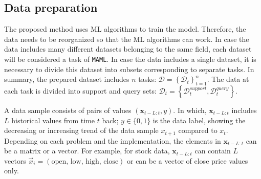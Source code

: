 \documentclass[aps,prb,groupedaddress,twocolumn,showpacs,dvipdfmx,superscriptaddress,pdftex]{revtex4-2}
\begin{document}
\subsection{Data preparation}


The proposed method uses ML algorithms to train the model. Therefore, the data needs to be reorganized so that the ML algorithms can work. In case the data includes many different datasets belonging to the same field, each dataset will be considered a task of \verb|MAML|. In case the data includes a single dataset, it is necessary to divide this dataset into subsets corresponding to separate tasks. In summary, the prepared dataset includes $n$ tasks: $\mathcal{D} = \left\{ \mathcal{D}_t \right\}_{t=1}^{n}$. The data at each task is divided into support and query sets: $\mathcal{D}_t = \left\{ \mathcal{D}_t^{support}, \mathcal{D}_t^{query} \right\}$.

\vspace{2mm}


A data sample consists of pairs of values $(\mathbf{x}_{t-L:t}, y)$. In which, $\mathbf{x}_{t-L:t}$ includes $L$ historical values from time $t$ back; $y\in \{0,1\}$ is the data label, showing the decreasing or increasing trend of the data sample $x_{t+1}$ compared to $x_{t}$. Depending on each problem and the implementation, the elements in $\mathbf{x}_{t-L:t}$ can be a matrix or a vector. For example, for stock data, $\mathbf{x}_{t-L:t}$ can contain $L$ vectors $\vec x_i = (\text{open, low, high, close})$ or can be a vector of close price values only.
\end{document}
